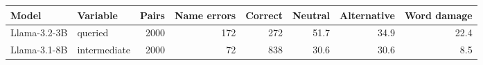 \begin{tabular}{@{}llrrrrrr@{}}
\toprule
Model & Variable & Pairs & Name errors & Correct & Neutral & Alternative & Word damage \\
\midrule
Llama-3.2-3B & queried & 2000 & 172 & 272 & 51.7 & 34.9 & 22.4 \\
Llama-3.1-8B & intermediate & 2000 & 72 & 838 & 30.6 & 30.6 & 8.5 \\
\bottomrule
\end{tabular}
